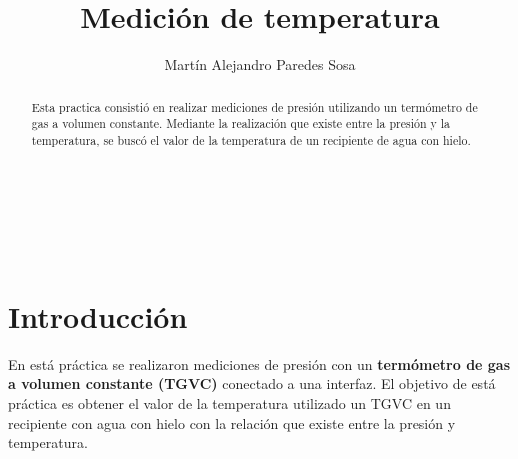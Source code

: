 \documentclass[12pt]{article}
\title{Medición de temperatura}
\author{Martín Alejandro Paredes Sosa}
\makeatletter
\let\thetitle\@title
\let\theauthor\@author
\makeatother
\begin{document}
\begin{center}
{ \large \bfseries \thetitle}\\
\end{center}
	\begin{minipage}{\textwidth}
		\begin{center} 
			\theauthor 
			\end{center}
	\end{minipage}\\[0.2 cm]
	
\begin{abstract}
	Esta practica consistió en realizar mediciones de presión utilizando un termómetro de gas a volumen constante. Mediante la realización que existe entre la presión y la temperatura, se buscó el valor de la temperatura de un recipiente de agua con hielo.
\end{abstract}
\vspace{-1cm}
\section{Introducción}
En está práctica se realizaron mediciones de presión con un \textbf{termómetro de gas a volumen constante (TGVC)} conectado a una interfaz. El objetivo de está práctica es obtener el valor de la temperatura utilizado un TGVC en un recipiente con agua con hielo con la relación que existe entre la presión y temperatura.
\end{document}
